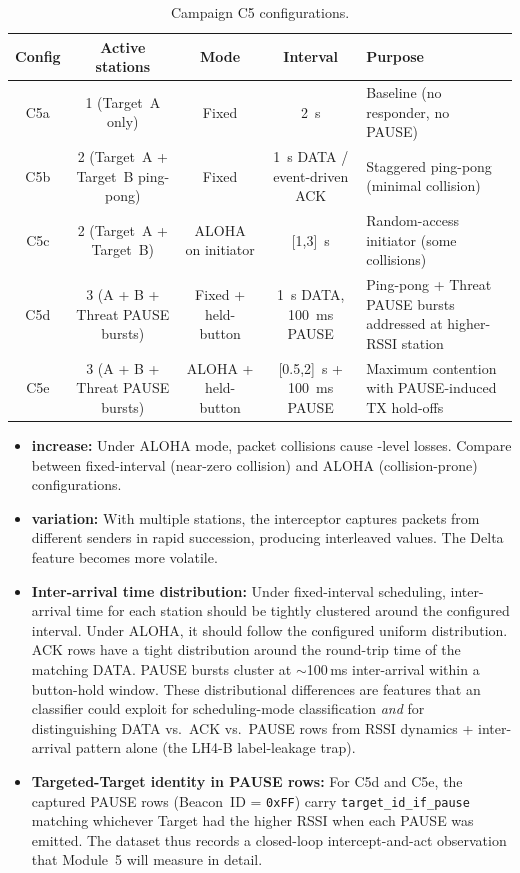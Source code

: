 \documentclass[11pt,letterpaper]{article}
\begin{document}
	\begin{table}[ht!]
		\centering
		\caption{Campaign C5 configurations.}
		\label{tab:c5}
		\renewcommand{\arraystretch}{1.3}
		\begin{tabularx}{\textwidth}{c c c c X}
			\toprule
			\textbf{Config} & \textbf{Active stations} & \textbf{Mode} & \textbf{Interval} & \textbf{Purpose} \\
			\midrule
			C5a & 1 (Target~A only)               & Fixed                 & 2~s              & Baseline (no responder, no PAUSE) \\
			C5b & 2 (Target~A + Target~B ping-pong) & Fixed                 & 1~s DATA / event-driven ACK & Staggered ping-pong (minimal collision) \\
			C5c & 2 (Target~A + Target~B)         & ALOHA on initiator    & [1,3]~s          & Random-access initiator (some collisions) \\
			C5d & 3 (A + B + Threat PAUSE bursts) & Fixed + held-button   & 1~s DATA, 100~ms PAUSE & Ping-pong + Threat PAUSE bursts addressed at higher-RSSI station \\
			C5e & 3 (A + B + Threat PAUSE bursts) & ALOHA + held-button   & [0.5,2]~s + 100~ms PAUSE & Maximum contention with PAUSE-induced TX hold-offs \\
			\bottomrule
		\end{tabularx}
	\end{table}

	\begin{tcolorbox}[infobox={What to Watch For in C5}]
		\begin{itemize}
			\item \textbf{\PER{} increase:} Under ALOHA mode, packet collisions cause \RF{}-level losses. Compare \PER{} between fixed-interval (near-zero collision) and ALOHA (collision-prone) configurations.
			\item \textbf{\RSSI{} variation:} With multiple stations, the interceptor captures packets from different senders in rapid succession, producing interleaved \RSSI{} values. The \RSSI{} Delta feature becomes more volatile.
			\item \textbf{Inter-arrival time distribution:} Under fixed-interval scheduling, inter-arrival time for each station should be tightly clustered around the configured interval. Under ALOHA, it should follow the configured uniform distribution. ACK rows have a tight distribution around the round-trip time of the matching DATA. PAUSE bursts cluster at $\sim$100\,ms inter-arrival within a button-hold window. These distributional differences are features that an \ML{} classifier could exploit for scheduling-mode classification \emph{and} for distinguishing DATA vs.\ ACK vs.\ PAUSE rows from RSSI dynamics + inter-arrival pattern alone (the LH4-B label-leakage trap).
			\item \textbf{Targeted-Target identity in PAUSE rows:} For C5d and C5e, the captured PAUSE rows (Beacon~ID = \texttt{0xFF}) carry \texttt{target\_id\_if\_pause} matching whichever Target had the higher RSSI when each PAUSE was emitted. The dataset thus records a closed-loop intercept-and-act observation that Module~5 will measure in detail.
		\end{itemize}
	\end{tcolorbox}
\end{document}
